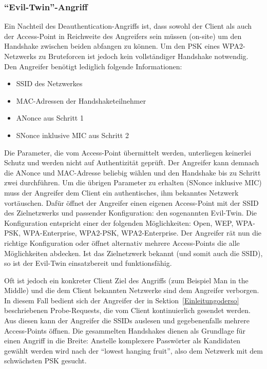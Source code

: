 \subsubsection{\enquote{Evil-Twin}-Angriff}
Ein Nachteil des Deauthentication-Angriffs ist, dass sowohl der Client als auch der Access-Point in Reichweite des Angreifers sein müssen (on-site) um den Handshake zwischen beiden abfangen zu können.
Um den PSK eines WPA2-Netzwerks zu Bruteforcen ist jedoch kein vollständiger Handshake notwendig.
Den Angreifer benötigt lediglich folgende Informationen:
\begin{itemize}
	\item SSID des Netzwerkes 
	\item MAC-Adressen der Handshaketeilnehmer
	\item ANonce aus Schritt 1
	\item SNonce inklusive MIC aus Schritt 2
\end{itemize}
Die Parameter, die vom Access-Point übermittelt werden, unterliegen keinerlei Schutz und werden nicht auf Authentizität geprüft.
Der Angreifer kann demnach die ANonce und MAC-Adresse beliebig wählen und den Handshake bis zu Schritt zwei durchführen.
Um die übrigen Parameter zu erhalten (SNonce inklusive MIC) muss der Angreifer dem Client ein authentisches, ihm bekanntes Netzwerk vortäuschen.
Dafür öffnet der Angreifer einen eigenen Access-Point mit der SSID des Zielnetzwerks und passender Konfiguration: den sogenannten Evil-Twin.
Die Konfiguration entspricht einer der folgenden Möglichkeiten: Open, WEP, WPA-PSK, WPA-Enterprise, WPA2-PSK, WPA2-Enterprise.
Der Angreifer rät nun die richtige Konfiguration oder öffnet alternativ mehrere Access-Points die alle Möglichkeiten abdecken.
Ist das Zielnetzwerk bekannt (und somit auch die SSID), so ist der Evil-Twin einsatzbereit und funktionsfähig.

Oft ist jedoch ein konkreter Client Ziel des Angriffs (zum Beispiel Man in the Middle) und die dem Client bekannten Netzwerke sind dem Angreifer verborgen.
In diesem Fall bedient sich der Angreifer der in Sektion~\ref{Einleitungoderso} beschriebenen Probe-Requests, die vom Client kontinuierlich gesendet werden.
Aus diesen kann der Angreifer die SSIDs auslesen und gegebenenfalls mehrere Access-Points öffnen.
Die gesammelten Handshakes dienen als Grundlage für einen Angriff in die Breite: Anstelle komplexere Passwörter als Kandidaten gewählt werden wird nach der \enquote{lowest hanging fruit}, also dem Netzwerk mit dem schwächsten PSK gesucht.


